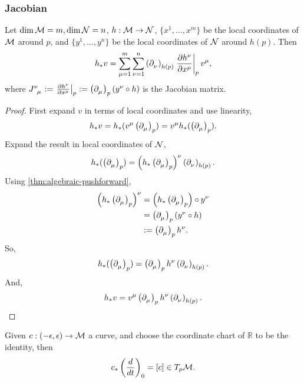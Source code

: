 \documentclass[../main.tex]{subfiles}
\begin{document}
    \subsubsection{Jacobian}
    \begin{theorem}\label{thm:pushforward-local}
        Let \(\dim \manifold[M]=m, \dim \manifold[N]=n\), \(h : \manifold[M] 
        \to \manifold[N]\), \(\{x^1, \dots, x^m\}\) be the local coordinates of 
        \(\manifold[M]\) around \(p\), and \(\{y^1, \dots, y^n\}\) be the local 
        coordinates of \(\manifold[N]\) around \(h(p)\). Then 
        \[
        h_*v = \sum_{\mu=1}^{m} \sum_{\nu=1}^{n} \tvec{\nu}{h(p)} 
        \left.\frac{\partial h^\nu}{\partial x^\mu}\right|_{p}v^\mu,
        \]
        where \(J\indices{^\nu_\mu}:=\left.\frac{\partial h^\nu}{\partial x^\mu}\right|_{p}
        :=\tvec{\mu}{p}(y^\nu\circ h)\) is the Jacobian matrix.
    \end{theorem}
    \begin{proof}
        First expand \(v\) in terms of local coordinates and use linearity, 
        \[
        h_*v = h_*(v^\mu \tvec{\mu}{p}) = v^\mu h_*(\tvec{\mu}{p}).
        \]
        Expand the result in local coordinates of \(\manifold[N]\), 
        \[
        h_*(\tvec{\mu}{p}) = \left(h_*\tvec{\mu}{p}\right)^\nu\tvec{\nu}{h(p)}.
        \]
        Using \cref{thm:algebraic-pushforward}, 
        \[
        \begin{aligned}
            \left(h_*\tvec{\mu}{p}\right)^\nu 
            &= \left(h_*\tvec{\mu}{p}\right)\circ y^\nu \\
            &= \tvec{\mu}{p}(y^\nu \circ h) \\
            &:= \tvec{\mu}{p}h^\nu.
        \end{aligned}
        \]
        So, 
        \[
        h_*(\tvec{\mu}{p}) = \tvec{\mu}{p}h^\nu\tvec{\nu}{h(p)}.
        \]
        And, 
        \[
        h_*v = v^\mu\tvec{\mu}{p}h^\nu\tvec{\nu}{h(p)}.
        \]
    \end{proof}
    \begin{theorem}\label{thm:curve-pushforward}
        Given \(c : (-\epsilon, \epsilon) \to \manifold[M]\) a curve, and choose 
        the coordinate chart of \(\mathbb{R}\) to be the identity, then 
        \[
        c_*\left(\frac{d}{dt}\right)_0=[c] \in T_p\manifold[M].
        \]
    \end{theorem}
\end{document}
